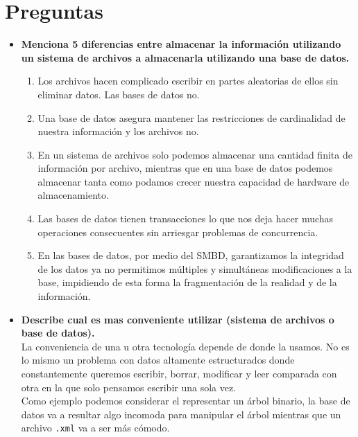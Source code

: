\documentclass[12pt,a4paper]{article}
\begin{document}
\section{Preguntas}
\begin{itemize}
	\item \textbf{Menciona 5 diferencias entre almacenar la información
		utilizando un sistema de archivos a almacenarla utilizando una base de datos.}\\
		\begin{enumerate}
			\item Los archivos hacen complicado escribir en partes aleatorias de ellos
				sin eliminar datos. Las bases de datos no.\\

			\item Una base de datos asegura mantener las restricciones de cardinalidad
				de nuestra información y los archivos no.\\

			\item En un sistema de archivos solo podemos almacenar una cantidad finita 
				de información por archivo, mientras que en una base de datos podemos 
				almacenar tanta como podamos crecer nuestra capacidad de hardware de
				almacenamiento. \\

			\item Las bases de datos tienen transacciones lo que nos deja hacer muchas
				operaciones consecuentes sin arriesgar problemas de concurrencia.\\
				
			\item En las bases de datos, por medio del SMBD, garantizamos la integridad 
				de los datos ya no permitimos múltiples y simultáneas modificaciones a la base, 
				impidiendo de esta forma la fragmentación de la realidad y de la información. \\
		\end{enumerate}


	\item \textbf{Describe cual es mas conveniente utilizar (sistema de archivos o base de datos).}\\

		La conveniencia de una u otra tecnología depende de donde la usamos.
		No es lo mismo un problema con datos altamente estructurados donde
		constantemente queremos escribir, borrar, modificar y leer comparada
		con otra en la que solo pensamos escribir una sola vez.\\

		Como ejemplo podemos considerar el representar un árbol binario, la base de
		datos va a resultar algo incomoda para manipular el árbol mientras
		que un archivo \texttt{.xml} va a ser más cómodo.\\
\end{itemize}
\end{document}
